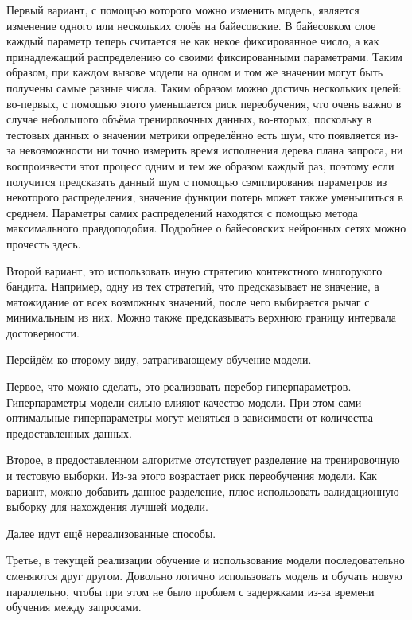 \documentclass[12pt]{article}
\begin{document}
Первый вариант, с помощью которого можно изменить модель, является изменение одного или нескольких слоёв на байесовские. В байесовком слое каждый параметр теперь считается не как некое фиксированное число, а как принадлежащий распределению со своими фиксированными параметрами. Таким образом, при каждом вызове модели на одном и том же значении могут быть получены самые разные числа. Таким образом можно достичь нескольких целей: во-первых, с помощью этого уменьшается риск переобучения, что очень важно в случае небольшого объёма тренировочных данных, во-вторых, поскольку в тестовых данных о значении метрики определённо есть шум, что появляется из-за невозможности ни точно измерить время исполнения дерева плана запроса, ни воспроизвести этот процесс одним и тем же образом каждый раз, поэтому если получится предсказать данный шум с помощью сэмплирования параметров из некоторого распределения, значение функции потерь может также уменьшиться в среднем. Параметры самих распределений находятся с помощью метода максимального правдоподобия. Подробнее о байесовских нейронных сетях можно прочесть здесь\cite{bayesian}.

Второй вариант, это использовать иную стратегию контекстного многорукого бандита. Например, одну из тех стратегий, что предсказывает не значение, а матожидание от всех возможных значений, после чего выбирается рычаг с минимальным из них. Можно также предсказывать верхнюю границу интервала достоверности.

Перейдём ко второму виду, затрагивающему обучение модели.

Первое, что  можно сделать, это реализовать перебор гиперпараметров. Гиперпараметры модели сильно влияют качество модели. При этом сами оптимальные гиперпараметры могут меняться в зависимости от количества предоставленных данных.

Второе, в предоставленном алгоритме отсутствует разделение на тренировочную и тестовую выборки. Из-за этого возрастает риск переобучения модели. Как вариант, можно добавить данное разделение, плюс использовать валидационную выборку для нахождения лучшей модели.

Далее идут ещё нереализованные способы. %

Третье, в текущей реализации обучение и использование модели последовательно сменяются друг другом. Довольно логично использовать модель и обучать новую параллельно, чтобы при этом не было проблем с задержками из-за времени обучения между запросами.
\end{document}
